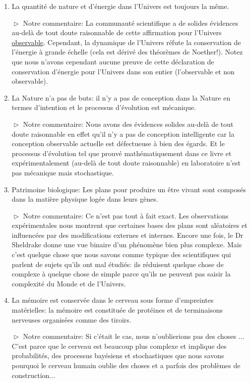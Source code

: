 \begin{enumerate}
		\item \og La quantité de nature et d'énergie dans l'Univers est toujours la même. \fg{}
		
		$\vartriangleright$ Notre commentaire: La communauté scientifique a de solides évidences au-delà de tout doute raisonnable de cette affirmation pour l'Univers \underline{observable}. Cependant, la dynamique de l'Univers réfute la conservation de l'énergie à grande échelle (cela est dérivé des théorèmes de Noether!). Notez que nous n'avons cependant aucune preuve de cette déclaration de conservation d'énergie pour l'Univers dans son entier (l'observable et non observable).

		\item \og La Nature n'a pas de buts: il n'y a pas de conception dans la Nature en termes d'intention et le processus d'évolution est mécanique.\fg{}
		
		$\vartriangleright$ Notre commentaire: Nous avons des évidences solides au-delà de tout doute raisonnable en effet qu'il n'y a pas de conception intelligente car la conception observable actuelle est défectueuse à bien des égards. Et le processus d'évolution tel que prouvé mathématiquement dans ce livre et expérimentalement (au-delà de tout doute raisonnable) en laboratoire n'est pas mécanique mais stochastique.
		
		\item \og Patrimoine biologique: Les plans pour produire un être vivant sont composés dans la matière physique logée dans leurs gènes. \fg{}
		
		$\vartriangleright$ Notre commentaire: Ce n'est pas tout à fait exact. Les observations expérimentales nous montrent que certaines bases des plans sont aléatoires et influencées par des modifications externes et internes. Encore une fois, le Dr Sheldrake donne une vue binaire d'un phénomène bien plus complexe. Mais c'est quelque chose que nous savons comme typique des scientifiques qui parlent de sujets qu'ils ont mal étudiés: ils réduisent quelque chose de complexe à quelque chose de simple parce qu'ils ne peuvent pas saisir la complexité du Monde et de l'Univers.

		\item \og La mémoire est conservée dans le cerveau sous forme d'empreintes matérielles: la mémoire est constituée de protéines et de terminaisons nerveuses organisées comme des tiroirs.\fg{}
		
		$\vartriangleright$ Notre commentaire: Si c'était le cas, nous n'oublierions pas des choses ... C'est parce que le cerveau est beaucoup plus complexe et implique des probabilités, des processus bayésiens et stochastiques que nous savons pourquoi le cerveau humain oublie des choses et a parfois des problèmes de construction...


\end{enumerate}
